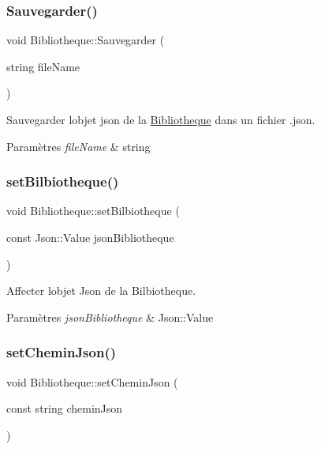\subsubsection{\texorpdfstring{Sauvegarder()}{Sauvegarder()}}
{\footnotesize\ttfamily void Bibliotheque\+::\+Sauvegarder (\begin{DoxyParamCaption}\item[{string}]{file\+Name }\end{DoxyParamCaption})}



Sauvegarder l\textquotesingle{}objet json de la \hyperlink{classBibliotheque}{Bibliotheque} dans un fichier .json. 


\begin{DoxyParams}{Paramètres}
{\em file\+Name} & string \\
\hline
\end{DoxyParams}
\mbox{\label{classBibliotheque_a8dc396d28693e921f7fd849944356434}} 
\subsubsection{\texorpdfstring{set\+Bilbiotheque()}{setBilbiotheque()}}
{\footnotesize\ttfamily void Bibliotheque\+::set\+Bilbiotheque (\begin{DoxyParamCaption}\item[{const Json\+::\+Value}]{json\+Bibliotheque }\end{DoxyParamCaption})}



Affecter l\textquotesingle{}objet Json de la Bilbiotheque. 


\begin{DoxyParams}{Paramètres}
{\em json\+Bibliotheque} & Json\+::\+Value \\
\hline
\end{DoxyParams}
\mbox{\label{classBibliotheque_ac9201ed432b00fc3cd2621db1c8df78b}} 
\subsubsection{\texorpdfstring{set\+Chemin\+Json()}{setCheminJson()}}
{\footnotesize\ttfamily void Bibliotheque\+::set\+Chemin\+Json (\begin{DoxyParamCaption}\item[{const string}]{chemin\+Json }\end{DoxyParamCaption})}



